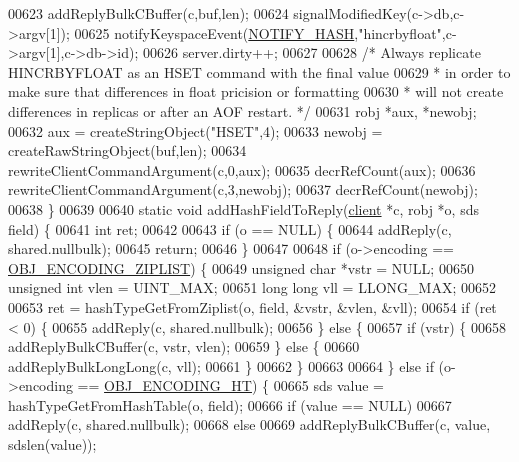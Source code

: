 \begin{DoxyCode}
00623     addReplyBulkCBuffer(c,buf,len);
00624     signalModifiedKey(c->db,c->argv[1]);
00625     notifyKeyspaceEvent(\hyperlink{server_8h_afe25ae13417e6fa5011e7efc69a34bc0}{NOTIFY\_HASH},\textcolor{stringliteral}{"hincrbyfloat"},c->argv[1],c->db->id);
00626     server.dirty++;
00627 
00628     \textcolor{comment}{/* Always replicate HINCRBYFLOAT as an HSET command with the final value}
00629 \textcolor{comment}{     * in order to make sure that differences in float pricision or formatting}
00630 \textcolor{comment}{     * will not create differences in replicas or after an AOF restart. */}
00631     robj *aux, *newobj;
00632     aux = createStringObject(\textcolor{stringliteral}{"HSET"},4);
00633     newobj = createRawStringObject(buf,len);
00634     rewriteClientCommandArgument(c,0,aux);
00635     decrRefCount(aux);
00636     rewriteClientCommandArgument(c,3,newobj);
00637     decrRefCount(newobj);
00638 \}
00639 
00640 \textcolor{keyword}{static} \textcolor{keywordtype}{void} addHashFieldToReply(\hyperlink{structclient}{client} *c, robj *o, sds field) \{
00641     \textcolor{keywordtype}{int} ret;
00642 
00643     \textcolor{keywordflow}{if} (o == NULL) \{
00644         addReply(c, shared.nullbulk);
00645         \textcolor{keywordflow}{return};
00646     \}
00647 
00648     \textcolor{keywordflow}{if} (o->encoding == \hyperlink{server_8h_aabf064ede983103f1fd0df2086e84eee}{OBJ\_ENCODING\_ZIPLIST}) \{
00649         \textcolor{keywordtype}{unsigned} \textcolor{keywordtype}{char} *vstr = NULL;
00650         \textcolor{keywordtype}{unsigned} \textcolor{keywordtype}{int} vlen = UINT\_MAX;
00651         \textcolor{keywordtype}{long} \textcolor{keywordtype}{long} vll = LLONG\_MAX;
00652 
00653         ret = hashTypeGetFromZiplist(o, field, &vstr, &vlen, &vll);
00654         \textcolor{keywordflow}{if} (ret < 0) \{
00655             addReply(c, shared.nullbulk);
00656         \} \textcolor{keywordflow}{else} \{
00657             \textcolor{keywordflow}{if} (vstr) \{
00658                 addReplyBulkCBuffer(c, vstr, vlen);
00659             \} \textcolor{keywordflow}{else} \{
00660                 addReplyBulkLongLong(c, vll);
00661             \}
00662         \}
00663 
00664     \} \textcolor{keywordflow}{else} \textcolor{keywordflow}{if} (o->encoding == \hyperlink{server_8h_a9c10219f68afc557d510d108257d238b}{OBJ\_ENCODING\_HT}) \{
00665         sds value = hashTypeGetFromHashTable(o, field);
00666         \textcolor{keywordflow}{if} (value == NULL)
00667             addReply(c, shared.nullbulk);
00668         \textcolor{keywordflow}{else}
00669             addReplyBulkCBuffer(c, value, sdslen(value));

\end{DoxyCode}
